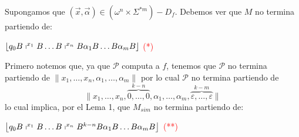 \begin{frame}
  \begin{block}{}
    \PN Supongamos que $(\vec{x},\vec{\alpha}) \in (\omega^{n} \times \Sigma^{\ast m}) - D_{f}$. Debemos ver que $M$ no
    termina partiendo de:
    \begin{center}
      $\left\lfloor q_{0} B \shortmid^{x_{1}} B \dotsc B \shortmid^{x_{n}} B \alpha_{1} B \dotsc B \alpha_{m} B
      \right\rfloor$ \textcolor{red}{(*)}
    \end{center}

    \PN Primero notemos que, ya que $\mathcal{P}$ computa a $f$, tenemos que $\mathcal{P}$ no termina partiendo de
    $\lVert x_{1}, \dotsc, x_{n}, \alpha_{1}, \dotsc, \alpha_{m}\rVert$ por lo cual $\mathcal{P}$ no termina partiendo
    de
    \begin{equation*}
      \lVert x_{1}, \dotsc, x_{n}, \overset{k-n}{\overbrace{0,\dotsc,0}}, \alpha_{1}, \dotsc, \alpha_{m},
      \overset{k-m}{\overbrace{\varepsilon,\dotsc,\varepsilon}} \rVert
    \end{equation*}
    \PN lo cual implica, por el Lema 1, que $M_{sim}$ no termina partiendo de:
    \begin{center}
      $\left\lfloor q_{0} B \shortmid^{x_{1}} B \dotsc B \shortmid^{x_{n}} B^{k-n}B \alpha_{1} B \dotsc B \alpha_{m} B
      \right\rfloor$ \textcolor{red}{(**)}
    \end{center}
  \end{block}
\end{frame}
